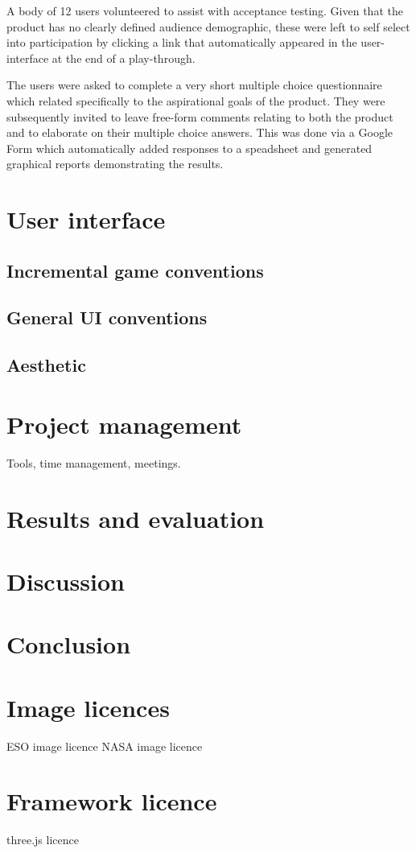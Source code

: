 \documentclass[twoside]{bhamthesis}
\begin{document}
A body of 12 users volunteered to assist with acceptance testing. Given that the product has no clearly defined audience demographic, these were left to self select into participation by clicking a link that automatically appeared in the user-interface at the end of a play-through.

The users were asked to complete a very short multiple choice questionnaire which related specifically to the aspirational goals of the product. They were subsequently invited to leave free-form comments relating to both the product and to elaborate on their multiple choice answers. This was done via a Google Form which automatically added responses to a speadsheet and generated graphical reports demonstrating the results.

\section{User interface}

\subsection{Incremental game conventions}

\subsection{General UI conventions}

\subsection{Aesthetic}


\section{Project management}

Tools, time management, meetings.



\section{Results and evaluation}



\section{Discussion}



\section{Conclusion}



\printbibliography

\appendix
\appendixpage
\addappheadtotoc

\section{Image licences}
ESO image licence
NASA image licence

\section{Framework licence}
three.js licence

\declaration
\end{document}

